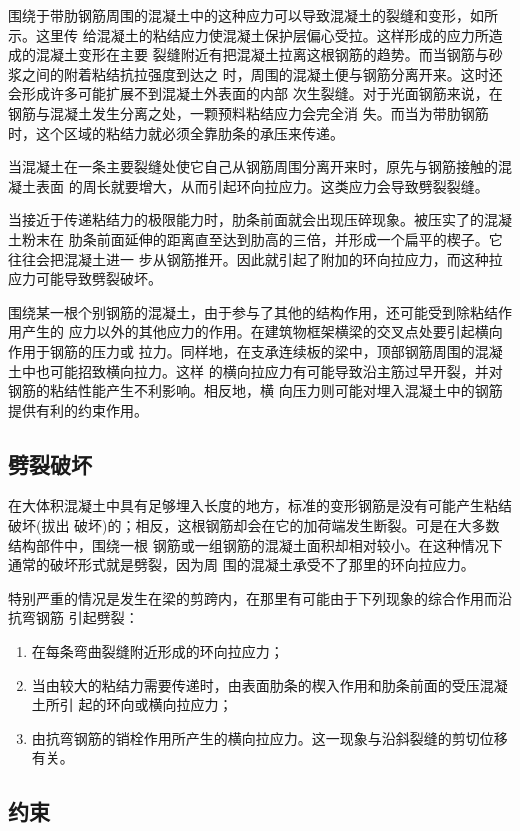 \documentclass[12pt,a4paper]{book}
\begin{document}
围绕于带肋钢筋周围的混凝土中的这种应力可以导致混凝土的裂缝和变形，如所示。这里传
给混凝土的粘结应力使混凝土保护层偏心受拉。这样形成的应力所造成的混凝土变形在主要
裂缝附近有把混凝土拉离这根钢筋的趋势。而当钢筋与砂浆之间的附着粘结抗拉强度到达之
时，周围的混凝土便与钢筋分离开来。这时还会形成许多可能扩展不到混凝土外表面的内部
次生裂缝。对于光面钢筋来说，在钢筋与混凝土发生分离之处，一颗预料粘结应力会完全消
失。而当为带肋钢筋时，这个区域的粘结力就必须全靠肋条的承压来传递。

当混凝土在一条主要裂缝处使它自己从钢筋周围分离开来时，原先与钢筋接触的混凝土表面
的周长就要增大，从而引起环向拉应力。这类应力会导致劈裂裂缝。

当接近于传递粘结力的极限能力时，肋条前面就会出现压碎现象。被压实了的混凝土粉末在
肋条前面延伸的距离直至达到肋高的三倍，并形成一个扁平的楔子。它往往会把混凝土进一
步从钢筋推开。因此就引起了附加的环向拉应力，而这种拉应力可能导致劈裂破坏。

围绕某一根个别钢筋的混凝土，由于参与了其他的结构作用，还可能受到除粘结作用产生的
应力以外的其他应力的作用。在建筑物框架横梁的交叉点处要引起横向作用于钢筋的压力或
拉力。同样地，在支承连续板的梁中，顶部钢筋周围的混凝土中也可能招致横向拉力。这样
的横向拉应力有可能导致沿主筋过早开裂，并对钢筋的粘结性能产生不利影响。相反地，横
向压力则可能对埋入混凝土中的钢筋提供有利的约束作用。

\subsection{劈裂破坏}


在大体积混凝土中具有足够埋入长度的地方，标准的变形钢筋是没有可能产生粘结破坏(拔出
破坏)的；相反，这根钢筋却会在它的加荷端发生断裂。可是在大多数结构部件中，围绕一根
钢筋或一组钢筋的混凝土面积却相对较小。在这种情况下通常的破坏形式就是劈裂，因为周
围的混凝土承受不了那里的环向拉应力。

特别严重的情况是发生在梁的剪跨内，在那里有可能由于下列现象的综合作用而沿抗弯钢筋
引起劈裂：
\begin{enumerate}
\item 在每条弯曲裂缝附近形成的环向拉应力；
\item 当由较大的粘结力需要传递时，由表面肋条的楔入作用和肋条前面的受压混凝土所引
起的环向或横向拉应力；
\item 由抗弯钢筋的销栓作用所产生的横向拉应力。这一现象与沿斜裂缝的剪切位移有关。
\end{enumerate}

\subsection{约束}
\end{document}
